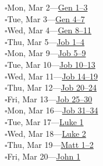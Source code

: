 \clearpage
\hypertarget{readingplan}{}
\twocolumn[%
  \vspace*{20pt}%
  {\centering\huge\booktitlefont\scshape March 2026\\%
  \char"2766\par}%
  \vspace{10pt}%
]

\hypertarget{rp-2026-03-02}{}\noindent$\square$\enspace Mon, Mar 2\enspace---\enspace \hyperlink{ch-genesis-1}{Gen 1--3}\\
\hypertarget{rp-2026-03-03}{}\noindent$\square$\enspace Tue, Mar 3\enspace---\enspace \hyperlink{ch-genesis-4}{Gen 4--7}\\
\hypertarget{rp-2026-03-04}{}\noindent$\square$\enspace Wed, Mar 4\enspace---\enspace \hyperlink{ch-genesis-8}{Gen 8--11}\\
\hypertarget{rp-2026-03-05}{}\noindent$\square$\enspace Thu, Mar 5\enspace---\enspace \hyperlink{ch-job-1}{Job 1--4}\\
\hypertarget{rp-2026-03-09}{}\noindent$\square$\enspace Mon, Mar 9\enspace---\enspace \hyperlink{ch-job-5}{Job 5--9}\\
\hypertarget{rp-2026-03-10}{}\noindent$\square$\enspace Tue, Mar 10\enspace---\enspace \hyperlink{ch-job-10}{Job 10--13}\\
\hypertarget{rp-2026-03-11}{}\noindent$\square$\enspace Wed, Mar 11\enspace---\enspace \hyperlink{ch-job-14}{Job 14--19}\\
\hypertarget{rp-2026-03-12}{}\noindent$\square$\enspace Thu, Mar 12\enspace---\enspace \hyperlink{ch-job-20}{Job 20--24}\\
\hypertarget{rp-2026-03-13}{}\noindent$\square$\enspace Fri, Mar 13\enspace---\enspace \hyperlink{ch-job-25}{Job 25--30}\\
\hypertarget{rp-2026-03-16}{}\noindent$\square$\enspace Mon, Mar 16\enspace---\enspace \hyperlink{ch-job-31}{Job 31--34}\\
\hypertarget{rp-2026-03-17}{}\noindent$\square$\enspace Tue, Mar 17\enspace---\enspace \hyperlink{ch-luke-1}{Luke 1}\\
\hypertarget{rp-2026-03-18}{}\noindent$\square$\enspace Wed, Mar 18\enspace---\enspace \hyperlink{ch-luke-2}{Luke 2}\\
\hypertarget{rp-2026-03-19}{}\noindent$\square$\enspace Thu, Mar 19\enspace---\enspace \hyperlink{ch-matthew-1}{Matt 1--2}\\
\hypertarget{rp-2026-03-20}{}\noindent$\square$\enspace Fri, Mar 20\enspace---\enspace \hyperlink{ch-john-1}{John 1}\\
